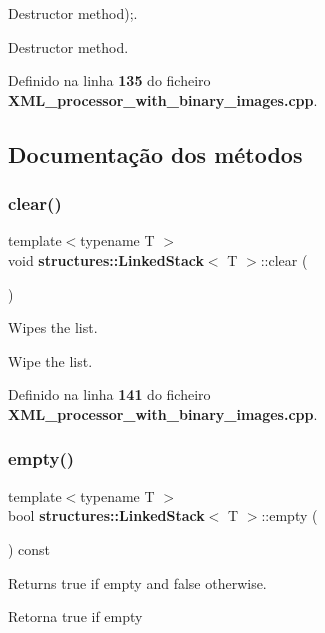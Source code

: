Destructor method);. 

Destructor method. 

Definido na linha \textbf{ 135} do ficheiro \textbf{ X\+M\+L\+\_\+processor\+\_\+with\+\_\+binary\+\_\+images.\+cpp}.



\subsection{Documentação dos métodos}
\mbox{\label{classstructures_1_1_linked_stack_a56cc909b4a3a0ff7a589f35032ca0ba8}} 
\subsubsection{clear()}
{\footnotesize\ttfamily template$<$typename T $>$ \\
void \textbf{ structures\+::\+Linked\+Stack}$<$ T $>$\+::clear (\begin{DoxyParamCaption}{ }\end{DoxyParamCaption})}



Wipes the list. 

Wipe the list. 

Definido na linha \textbf{ 141} do ficheiro \textbf{ X\+M\+L\+\_\+processor\+\_\+with\+\_\+binary\+\_\+images.\+cpp}.

\mbox{\label{classstructures_1_1_linked_stack_ac9704fd697f9c4ed4f7fc4e786114e4f}} 
\subsubsection{empty()}
{\footnotesize\ttfamily template$<$typename T $>$ \\
bool \textbf{ structures\+::\+Linked\+Stack}$<$ T $>$\+::empty (\begin{DoxyParamCaption}{ }\end{DoxyParamCaption}) const}



Returns true if empty and false otherwise. 

\begin{DoxyReturn}{Retorna}
true if empty 
\end{DoxyReturn}


